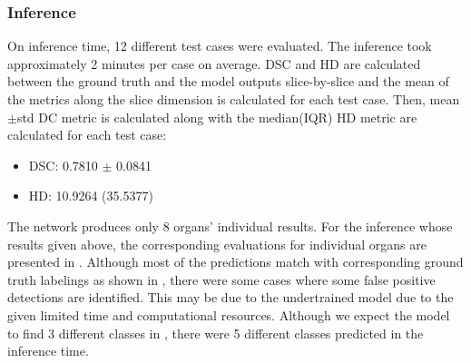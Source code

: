 \documentclass{IEEEtran}
\begin{document}
\subsubsection{Inference}
On inference time, 12 different test cases were evaluated. The inference took approximately 2 minutes per case on average. DSC and HD are calculated between the ground truth and the model outputs slice-by-slice and the mean of the metrics along the slice dimension is calculated for each test case. Then, mean$\pm$std DC metric is calculated along with the median(IQR) HD metric are calculated for each test case:

\begin{itemize}
    \item DSC: 0.7810 $\pm$ 0.0841
    \item HD: 10.9264 (35.5377)
\end{itemize}

The network produces only 8 organs' individual results. For the inference whose results given above, the corresponding evaluations for individual organs are presented in . Although most of the predictions match with corresponding ground truth labelings as shown in , there were some cases where some false positive detections are identified. This may be due to the undertrained model due to the given limited time and computational resources. Although we expect the model to find 3 different classes in , there were 5 different classes predicted in the inference time. 

\begin{table}[h]
\caption{\label{tab:organs}Segmentation performance on individual organs utilized in the study}
\end{table}
\end{document}
